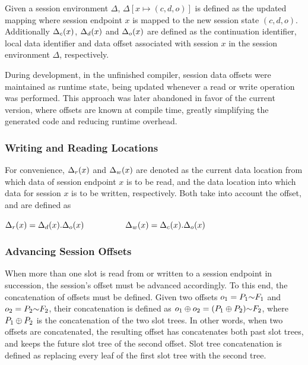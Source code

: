 Given a session environment $\Delta$, $\Delta[x \mapsto (c, d, o)]$ is defined as the updated mapping where session endpoint $x$ is mapped to the new session state $(c, d, o)$. Additionally $\Delta_c(x)$, $\Delta_d(x)$ and $\Delta_o(x)$ are defined as the continuation identifier, local data identifier and data offset associated with session $x$ in the session environment $\Delta$, respectively.

During development, in the unfinished compiler, session data offsets were maintained as runtime state, being updated whenever a read or write operation was performed. This approach was later abandoned in favor of the current version, where offsets are known at compile time, greatly simplifying the generated code and reducing runtime overhead.

\subsubsection{Writing and Reading Locations}

For convenience, $\Delta_r(x)$ and $\Delta_w(x)$ are denoted as the current data location from which data of session endpoint $x$ is to be read, and the data location into which data for session $x$ is to be written, respectively. Both take into account the offset, and are defined as

\centerline{\vspace{2pt}
$\Delta_r(x) = \Delta_d(x).\Delta_o(x) \hspace{5em} \Delta_w(x) = \Delta_c(x).\Delta_o(x)$}

\subsubsection{Advancing Session Offsets} \label{subsubsection:AdvancingOffsets}

When more than one slot is read from or written to a session endpoint in succession, the session's offset must be advanced accordingly. To this end, the concatenation of offsets must be defined. Given two offsets $o_1 = P_1\text{$\sim$}F_1$ and $o_2 = P_2\text{$\sim$}F_2$, their concatenation is defined as $o_1\oplus o_2 = (P_1\oplus P_2)\text{$\sim$}F_2$, where $P_1\oplus P_2$ is the concatenation of the two slot trees. In other words, when two offsets are concatenated, the resulting offset has concatenates both past slot trees, and keeps the future slot tree of the second offset. Slot tree concatenation is defined as replacing every leaf of the first slot tree with the second tree.

